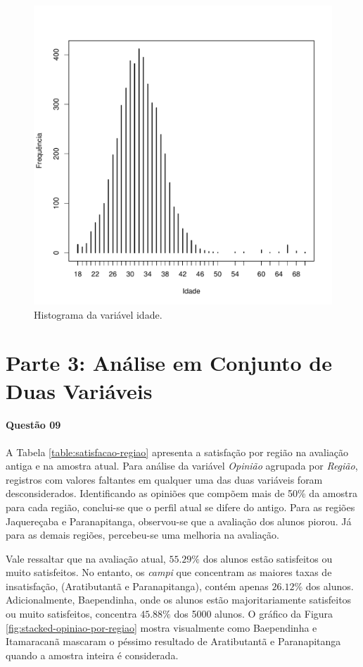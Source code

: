 \documentclass[10pt,a4paper,oneside]{article}
\newcommand{\arat}{Aratibutantã\xspace}
\newcommand{\baep}{Baependinha\xspace}
\newcommand{\itam}{Itamaracanã\xspace}
\newcommand{\jaqu}{Jaquereçaba\xspace}
\newcommand{\para}{Paranapitanga\xspace}
\begin{document}
\begin{figure}[h]
\begin{minipage}{0.46\textwidth}
	\includegraphics[width=\linewidth]{plots/histograma-idade}
	\caption{Histograma da variável idade. }
	\label{figure: histograma idade}
\end{minipage}
\end{figure}

\section*{Parte 3: Análise em Conjunto de Duas Variáveis}

\paragraph{Questão 09}

A Tabela \ref{table:satisfacao-regiao} apresenta a satisfação por região na avaliação antiga e na amostra atual. Para análise da variável \textit{Opinião} agrupada por \textit{Região}, registros com valores faltantes em qualquer uma das duas variáveis foram desconsiderados. Identificando as opiniões que compõem mais de 50\% da amostra para cada região, conclui-se que o perfil atual se difere do antigo. Para as regiões \jaqu e \para, observou-se que a avaliação dos alunos piorou. Já para as demais regiões, percebeu-se uma melhoria na avaliação. 

Vale ressaltar que na avaliação atual, $55.29\%$ dos alunos estão satisfeitos ou muito satisfeitos. No entanto, os \textit{campi} que concentram as maiores taxas de insatisfação, (\arat e \para), contém apenas $26.12\%$ dos alunos. Adicionalmente, \baep, onde os alunos estão majoritariamente satisfeitos ou muito satisfeitos, concentra $45.88\%$ dos 5000 alunos. O gráfico da Figura \ref{fig:stacked-opiniao-por-regiao} mostra visualmente como \baep e \itam mascaram o péssimo resultado de \arat e \para quando a amostra inteira é considerada.
\end{document}
